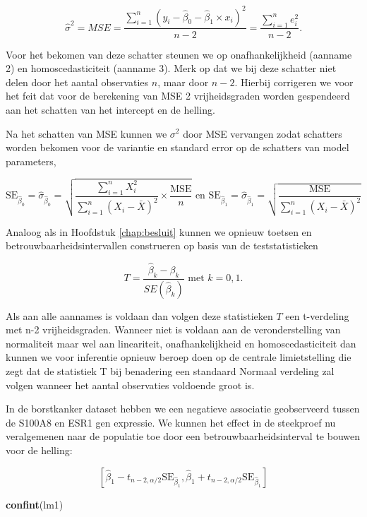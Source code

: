 \documentclass[
  12pt,dutch,coursenotes]{book}
\newenvironment{Shaded}{\begin{snugshade}}{\end{snugshade}}
\newcommand{\KeywordTok}[1]{\textcolor[rgb]{0.13,0.29,0.53}{\textbf{#1}}}
\newcommand{\NormalTok}[1]{#1}
\theoremstyle{definition}
\theoremstyle{definition}
\theoremstyle{definition}
\theoremstyle{remark}
\begin{document}
\[\hat\sigma^2=MSE=\frac{\sum\limits_{i=1}^n \left(y_i-\hat\beta_0-\hat\beta_1\times x_i\right)^2}{n-2}=\frac{\sum\limits_{i=1}^n e^2_i}{n-2}.\]

Voor het bekomen van deze schatter steunen we op onafhankelijkheid (aanname 2) en homoscedasticiteit (aanname 3). Merk op dat we bij deze schatter niet delen door het aantal observaties \(n\), maar door \(n-2\). Hierbij corrigeren we voor het feit dat voor de berekening van MSE 2 vrijheidsgraden worden gespendeerd aan het schatten van het intercept en de helling.

Na het schatten van MSE kunnen we \(\sigma^2\) door MSE vervangen zodat schatters worden bekomen voor de variantie en standard error op de schatters van model parameters,

\[\text{SE}_{\hat{\beta}_0}=\hat\sigma_{\hat{\beta}_0}=\sqrt{\frac{\sum\limits_{i=1}^n X^2_i}{\sum\limits_{i=1}^n (X_i-\bar X)^2} \times\frac{\text{MSE}}{n}} \text{ en } \text{SE}_{\hat{\beta}_1}=\hat\sigma_{\hat{\beta}_1}=\sqrt{\frac{\text{MSE}}{\sum\limits_{i=1}^n (X_i-\bar X)^2}}\]

Analoog als in Hoofdstuk \ref{chap:besluit} kunnen we opnieuw toetsen en betrouwbaarheidsintervallen construeren op basis van de teststatistieken

\[T=\frac{\hat{\beta}_k-\beta_k}{SE(\hat{\beta}_k)} \text{ met } k=0,1.\]

Als aan alle aannames is voldaan dan volgen deze statistieken \(T\) een t-verdeling met n-2 vrijheidsgraden.
Wanneer niet is voldaan aan de veronderstelling van normaliteit maar wel aan lineariteit, onafhankelijkheid en homoscedasticiteit dan kunnen we voor inferentie opnieuw beroep doen op de centrale limietstelling die zegt dat de statistiek T bij benadering een standaard Normaal verdeling zal volgen wanneer het aantal observaties voldoende groot is.

In de borstkanker dataset hebben we een negatieve associatie geobserveerd tussen de S100A8 en ESR1 gen expressie.
We kunnen het effect in de steekproef nu veralgemenen naar de populatie toe door een betrouwbaarheidsinterval te bouwen voor de helling:

\[[\hat\beta_1 - t_{n-2,\alpha/2} \text{SE}_{\hat\beta_1},\hat\beta_1 + t_{n-2,\alpha/2} \text{SE}_{\hat\beta_1}]\]

\begin{Shaded}
\begin{Highlighting}[]
\KeywordTok{confint}\NormalTok{(lm1)}
\end{Highlighting}
\end{Shaded}
\end{document}
